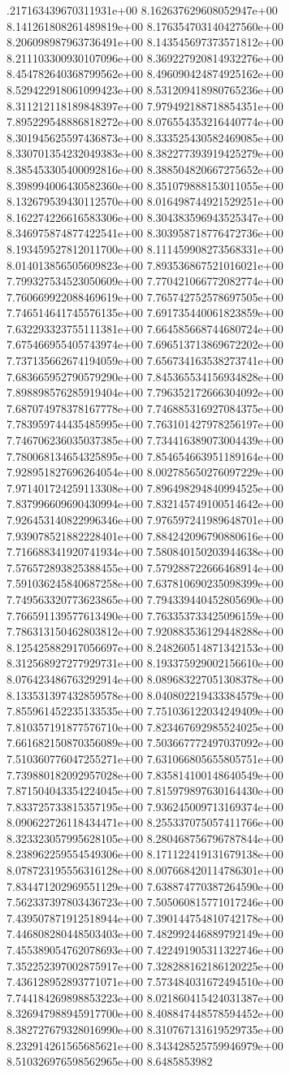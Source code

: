 .217163439670311931e+00	8.162637629608052947e+00	8.141261808261489819e+00	8.176354703140427560e+00	8.206098987963736491e+00	8.143545697373571812e+00	8.211103300930107096e+00	8.369227920814932276e+00	8.454782640368799562e+00	8.496090424874925162e+00	8.529422918061099423e+00	8.531209418980765236e+00	8.311212118189848397e+00	7.979492188718854351e+00	7.895229548886818272e+00	8.076554353216440774e+00	8.301945625597436873e+00	8.333525430582469085e+00	8.330701354232049383e+00	8.382277393919425279e+00	8.385453305400092816e+00	8.388504820667275652e+00	8.398994006430582360e+00	8.351079888153011055e+00	8.132679539430112570e+00	8.016498744921529251e+00	8.162274226616583306e+00	8.304383596943525347e+00	8.346975874877422541e+00	8.303958718776472736e+00	8.193459527812011700e+00	8.111459908273568331e+00	8.014013856505609823e+00	7.893536867521016021e+00	7.799327534523050609e+00	7.770421066772082774e+00	7.760669922088469619e+00	7.765742752578697505e+00	7.746514641745576135e+00	7.691735440061823859e+00	7.632293323755111381e+00	7.664585668744680724e+00	7.675466955405743974e+00	7.696513713869672202e+00	7.737135662674194059e+00	7.656734163538273741e+00	7.683665952790579290e+00	7.845365534156934828e+00	7.898898576285919404e+00	7.796352172666304092e+00	7.687074978378167778e+00	7.746885316927084375e+00	7.783959744435485995e+00	7.763101427978256197e+00	7.746706236035037385e+00	7.734416389073004439e+00	7.780068134654325895e+00	7.854654663951189164e+00	7.928951827696264054e+00	8.002785650276097229e+00	7.971401724259113308e+00	7.896498294840994525e+00	7.837996609690430994e+00	7.832145749100514642e+00	7.926453140822996346e+00	7.976597241989648701e+00	7.939078521882228401e+00	7.884242096790880616e+00	7.716688341920741934e+00	7.580840150203944638e+00	7.576572893825388455e+00	7.579288722666468914e+00	7.591036245840687258e+00	7.637810690235098399e+00	7.749563320773623865e+00	7.794339440452805690e+00	7.766591139577613490e+00	7.763353733425096159e+00	7.786313150462803812e+00	7.920883536129448288e+00	8.125425882917056697e+00	8.248260514871342153e+00	8.312568927277929731e+00	8.193375929002156610e+00	8.076423486763292914e+00	8.089683227051308378e+00	8.133531397432859578e+00	8.040802219433384579e+00	7.855961452235133535e+00	7.751036122034249409e+00	7.810357191877576710e+00	7.823467692985524025e+00	7.661682150870356089e+00	7.503667772497037092e+00	7.510360776047255271e+00	7.631066805655805751e+00	7.739880182092957028e+00	7.835814100148640549e+00	7.871504043354224045e+00	7.815979897630164430e+00	7.833725733815357195e+00	7.936245009713169374e+00	8.090622726118434471e+00	8.255337075057411766e+00	8.323323057995628105e+00	8.280468756796787844e+00	8.238962259554549306e+00	8.171122419131679138e+00	8.078723195556316128e+00	8.007668420114786301e+00	7.834471202969551129e+00	7.638874770387264590e+00	7.562337397803436723e+00	7.505060815771017246e+00	7.439507871912518944e+00	7.390144754810742178e+00	7.446808280448503403e+00	7.482992446889792149e+00	7.455389054762078693e+00	7.422491905311322746e+00	7.352252397002875917e+00	7.328288162186120225e+00	7.436128952893771071e+00	7.573484031672494510e+00	7.744184269898853223e+00	8.021860415424031387e+00	8.326947988945917700e+00	8.408847448578594452e+00	8.382727679328016990e+00	8.310767131619529735e+00	8.232914261565685621e+00	8.343428525759946979e+00	8.510326976598562965e+00	8.6485853982